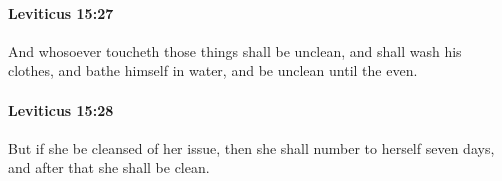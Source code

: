 		\paragraph{Leviticus 15:27} %
			\label{LEVITICUS-15-27}

			And whosoever toucheth those things shall be unclean, and shall wash his clothes, and bathe himself in water, and be unclean until the even.


		\paragraph{Leviticus 15:28} %
			\label{LEVITICUS-15-28}

			But if she be cleansed of her issue, then she shall number to herself seven days, and after that she shall be clean.


